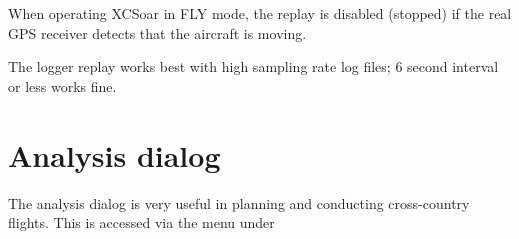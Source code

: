 \documentclass[a4paper,12pt]{refrep}
\begin{document}
When operating XCSoar in FLY mode, the replay is disabled (stopped) if
the real GPS receiver detects that the aircraft is moving.

The logger replay works best with high sampling rate log files;
6 second interval or less works fine.

\section{Analysis dialog}\label{sec:analysis-dialog-climb}

The analysis dialog is very useful in planning and conducting
cross-country flights.  This is accessed via the menu under
\begin{quote}
\blink{}
\end{quote}
\end{document}
